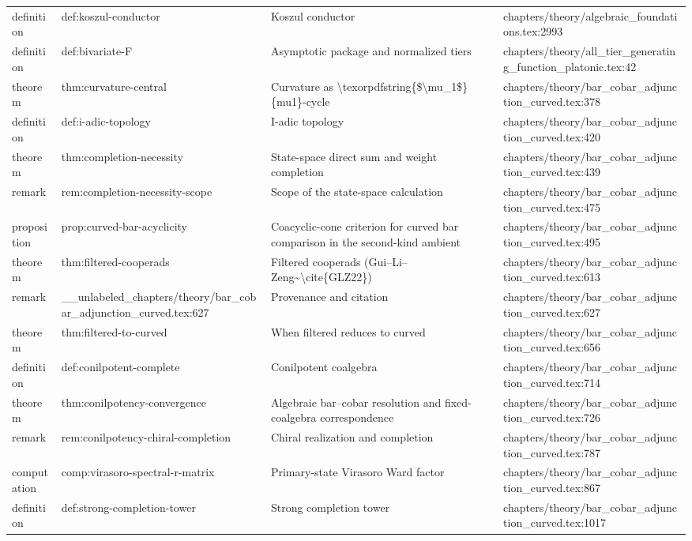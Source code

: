 \documentclass[11pt]{article}
\begin{document}
\begin{longtable}{L{0.10\textwidth}L{0.26\textwidth}L{0.42\textwidth}L{0.22\textwidth}}
definition & def:koszul-conductor & Koszul conductor & chapters/theory/algebraic\_foundations.tex:2993\\
definition & def:bivariate-F & Asymptotic package and normalized tiers & chapters/theory/all\_tier\_generating\_function\_platonic.tex:42\\
theorem & thm:curvature-central & Curvature as \textbackslash{}texorpdfstring\{\$\textbackslash{}mu\_1\$\}\{mu1\}-cycle & chapters/theory/bar\_cobar\_adjunction\_curved.tex:378\\
definition & def:i-adic-topology & I-adic topology & chapters/theory/bar\_cobar\_adjunction\_curved.tex:420\\
theorem & thm:completion-necessity & State-space direct sum and weight completion & chapters/theory/bar\_cobar\_adjunction\_curved.tex:439\\
remark & rem:completion-necessity-scope & Scope of the state-space calculation & chapters/theory/bar\_cobar\_adjunction\_curved.tex:475\\
proposition & prop:curved-bar-acyclicity & Coacyclic-cone criterion for curved bar comparison in the second-kind ambient & chapters/theory/bar\_cobar\_adjunction\_curved.tex:495\\
theorem & thm:filtered-cooperads & Filtered cooperads (Gui--Li--Zeng\textasciitilde{}\textbackslash{}cite\{GLZ22\}) & chapters/theory/bar\_cobar\_adjunction\_curved.tex:613\\
remark & \_\_unlabeled\_chapters/theory/bar\_cobar\_adjunction\_curved.tex:627 & Provenance and citation & chapters/theory/bar\_cobar\_adjunction\_curved.tex:627\\
theorem & thm:filtered-to-curved & When filtered reduces to curved & chapters/theory/bar\_cobar\_adjunction\_curved.tex:656\\
definition & def:conilpotent-complete & Conilpotent coalgebra & chapters/theory/bar\_cobar\_adjunction\_curved.tex:714\\
theorem & thm:conilpotency-convergence & Algebraic bar--cobar resolution and fixed-coalgebra correspondence & chapters/theory/bar\_cobar\_adjunction\_curved.tex:726\\
remark & rem:conilpotency-chiral-completion & Chiral realization and completion & chapters/theory/bar\_cobar\_adjunction\_curved.tex:787\\
computation & comp:virasoro-spectral-r-matrix & Primary-state Virasoro Ward factor & chapters/theory/bar\_cobar\_adjunction\_curved.tex:867\\
definition & def:strong-completion-tower & Strong completion tower & chapters/theory/bar\_cobar\_adjunction\_curved.tex:1017\\

\end{longtable}
\end{document}
